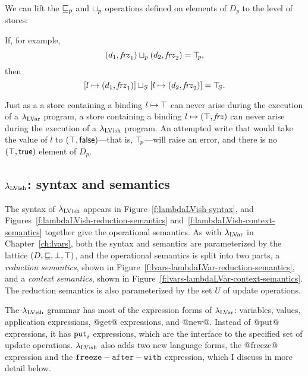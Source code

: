 We can lift the $\sqsubseteq_p$ and $ \sqcup_p $ operations defined on elements
of $D_p$ to the level of stores:

\DefLeqStore

\DefLubStore

If, for example,
\[ (d_1, \mathit{frz}_1) \sqcup_p (d_2, \mathit{frz}_2) = \top\hspace{-0.85mm}_{p}, \]
then
\[ \left[ l \mapsto (d_1, \mathit{frz}_1) \right] \sqcup_{S} \left[ l \mapsto (d_2, \mathit{frz}_2) \right] =
\top\hspace{-0.85mm}_{S}. \]

Just as a a store containing a binding $l \mapsto \top$ can
never arise during the execution of a $\lambda_{\textrm{LVar}}$ program, a store
containing a binding $l \mapsto (\top, \mathit{frz})$ can never arise
during the execution of a $\lambda_{\textrm{LVish}}$ program. An attempted write
that would take the value of $l$ to
$(\top, \textsf{false})$---that is, $\top\hspace{-0.85mm}_{p}$---will raise an error,
and there is no $(\top, \textsf{true})$ element of $D_p$.

\subsection{$\lambda_{\textrm{LVish}}$: syntax and semantics}

\FigLambdaLVishGrammar

\FigLambdaLVishReductionSemantics

\FigLambdaLVishContextSemantics

The syntax of $\lambda_{\textrm{LVish}}$ appears in
Figure~\ref{f:lambdaLVish-syntax}, and
Figures~\ref{f:lambdaLVish-reduction-semantics}
and~\ref{f:lambdaLVish-context-semantics} together give the
operational semantics.  As with $\lambda_{\textrm{LVar}}$ in
Chapter~\ref{ch:lvars}, both the syntax and semantics are
parameterized by the lattice $(D, \sqsubseteq, \bot, \top)$, and the
operational semantics is split into two parts, a \emph{reduction
  semantics}, shown in
Figure~\ref{f:lvars-lambdaLVar-reduction-semantics}, and a
\emph{context semantics}, shown in
Figure~\ref{f:lvars-lambdaLVar-context-semantics}.  The reduction
semantics is also parameterized by the set $U$ of update operations.

The $\lambda_{\textrm{LVish}}$ grammar has most of the expression forms of
$\lambda_{\textrm{LVar}}$: variables, values, application expressions, @get@
expressions, and @new@.  Instead of @put@ expressions, it has $\mbox{\texttt{put}}_i$
expressions, which are the interface to the specified set of update
operations.  $\lambda_{\textrm{LVish}}$ also adds two new language forms, the
@freeze@ expression and the ${\mbox{\texttt{freeze}}-\mbox{\texttt{after}}-\mbox{\texttt{with}}}$ expression, which I discuss in more
detail below.

